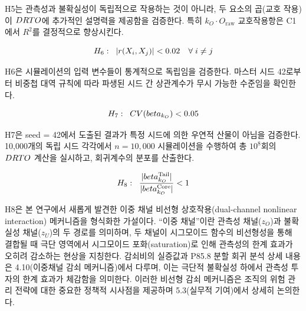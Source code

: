 H5는 관측성과 불확실성이 독립적으로 작용하는 것이 아니라,
두 요소의 곱(교호 작용)이 $DRTO$에 추가적인 설명력을 제공함을 검증한다.
특히 $k_O \cdot O_{\text{raw}}$ 교호작용항은 C1에서 $R^2$를 결정적으로 향상시킨다.



\[
  H_6:\;\; |r(X_i, X_j)| < 0.02 \quad \forall\; i \neq j
\]

H6은 시뮬레이션의 입력 변수들이 통계적으로 독립임을 검증한다.
마스터 시드 42로부터 비중첩 대역 규칙에 따라 파생된 시드 간
상관계수가 무시 가능한 수준임을 확인한다.


\[
  H_7:\;\; CV(beta_{k_O}) < 0.05
\]

H7은 seed = 42에서 도출된 결과가 특정 시드에 의한 우연적 산물이 아님을
검증한다. 10{,}000개의 독립 시드 각각에서 $n = 10{,}000$ 시뮬레이션을
수행하여 총 $10^8$회의 $DRTO$ 계산을 실시하고,
회귀계수의 분포를 산출한다.



\[
  H_8:\;\; \frac{|beta_{k_O}^{\text{Tail}}|}{|beta_{k_O}^{\text{Core}}|} < 1
\]

H8은 본 연구에서 새롭게 발견한 이중 채널 비선형 상호작용(dual-channel nonlinear
interaction) 메커니즘을 형식화한 가설이다.
``이중 채널''이란 관측성 채널($z_O$)과 불확실성 채널($z_U$)의 두 경로를 의미하며,
두 채널이 시그모이드 함수의 비선형성을 통해 결합될 때
극단 영역에서 시그모이드 포화(saturation)로 인해 관측성의 한계 효과가
오히려 감소하는 현상을 지칭한다.
감쇠비의 실증값과 P85.8 분할 회귀 분석 상세 내용은 4.10(이중채널 감쇠 메커니즘)에서 다루며,
이는 극단적 불확실성 하에서 관측성 투자의 한계 효과가 체감함을 의미한다.
이러한 비선형 감쇠 메커니즘은 조직의 위험 관리 전략에 대한
중요한 정책적 시사점을 제공하며 5.3(실무적 기여)에서 상세히 논의한다.


